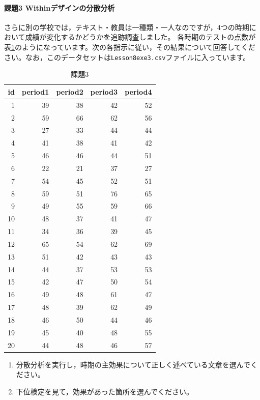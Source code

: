 \documentclass{ltjsarticle}
\begin{document}
\paragraph{課題3 Withinデザインの分散分析}
さらに別の学校では，テキスト・教員は一種類・一人なのですが，4つの時期において成績が変化するかどうかを追跡調査しました。
各時期のテストの点数が表\ref{L23::exe3}のようになっています。次の各指示に従い，その結果について回答してください。なお，このデータセットは\texttt{Lesson8exe3.csv}ファイルに入っています。

\begin{table}[ht]
  \centering
  \caption{課題3}
\begin{tabular}{r|rrrr}
  \hline
  id & period1 & period2 & period3 & period4\\
  \hline
  1 & 39 & 38 & 42 & 52\\
  2 & 59 & 66 & 62 & 56\\
  3 & 27 & 33 & 44 & 44\\
  4 & 41 & 38 & 41 & 42\\
  5 & 46 & 46 & 44 & 51\\
  6 & 22 & 21 & 37 & 27\\
  7 & 54 & 45 & 52 & 51\\
  8 & 59 & 51 & 76 & 65\\
  9 & 49 & 55 & 59 & 66\\
  10 & 48 & 37 & 41 & 47\\
  11 & 34 & 36 & 39 & 45\\
  12 & 65 & 54 & 62 & 69\\
  13 & 51 & 42 & 43 & 43\\
  14 & 44 & 37 & 53 & 53\\
  15 & 42 & 47 & 50 & 54\\
  16 & 49 & 48 & 61 & 47\\
  17 & 48 & 39 & 62 & 49\\
  18 & 46 & 50 & 44 & 46\\
  19 & 45 & 40 & 48 & 55\\
  20 & 44 & 48 & 46 & 57\\
  \hline
  \end{tabular}
  \label{L23::exe3}
\end{table}

\begin{enumerate}
  \item 分散分析を実行し，時期の主効果について正しく述べている文章を選んでください。
  \item 下位検定を見て，効果があった箇所を選んでください。
\end{enumerate}
\end{document}
